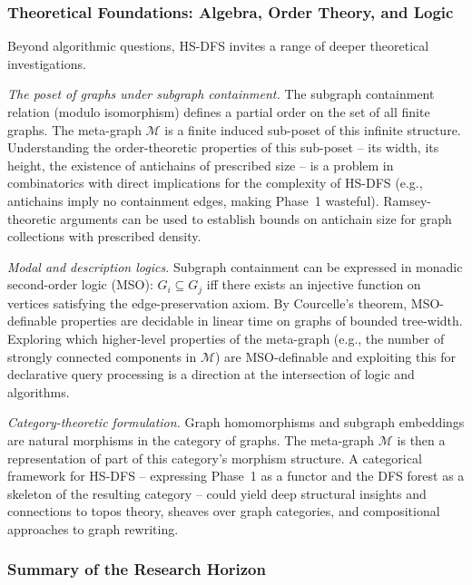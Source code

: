 ﻿\documentclass[12pt,a4paper]{article}
\theoremstyle{plain}
\theoremstyle{definition}
\theoremstyle{remark}
\begin{document}
	\subsubsection*{Theoretical Foundations: Algebra, Order Theory, and Logic}

	Beyond algorithmic questions, HS-DFS invites a range of deeper
	theoretical investigations.

	\emph{The poset of graphs under subgraph containment.}  The subgraph
	containment relation (modulo isomorphism) defines a partial order on
	the set of all finite graphs.  The meta-graph $\mathcal{M}$ is a
	finite induced sub-poset of this infinite structure.  Understanding the
	order-theoretic properties of this sub-poset -- its width, its height,
	the existence of antichains of prescribed size -- is a problem in
	combinatorics with direct implications for the complexity of HS-DFS
	(e.g., antichains imply no containment edges, making Phase~1 wasteful).
	Ramsey-theoretic arguments can be used to establish bounds on antichain
	size for graph collections with prescribed density.

	\emph{Modal and description logics.}  Subgraph containment can be expressed
	in monadic second-order logic (MSO): $G_i \subseteq G_j$ iff there exists
	an injective function on vertices satisfying the edge-preservation axiom.
	By Courcelle's theorem, MSO-definable properties are decidable in
	linear time on graphs of bounded tree-width.  Exploring which higher-level
	properties of the meta-graph (e.g., the number of strongly connected
	components in $\mathcal{M}$) are MSO-definable and exploiting this for
	declarative query processing is a direction at the intersection of logic
	and algorithms.

	\emph{Category-theoretic formulation.}  Graph homomorphisms and subgraph
	embeddings are natural morphisms in the category of graphs.  The
	meta-graph $\mathcal{M}$ is then a representation of part of this
	category's morphism structure.  A categorical framework for HS-DFS --
	expressing Phase~1 as a functor and the DFS forest as a skeleton of
	the resulting category -- could yield deep structural insights and
	connections to topos theory, sheaves over graph categories, and
	compositional approaches to graph rewriting.

	\subsubsection*{Summary of the Research Horizon}
\end{document}
